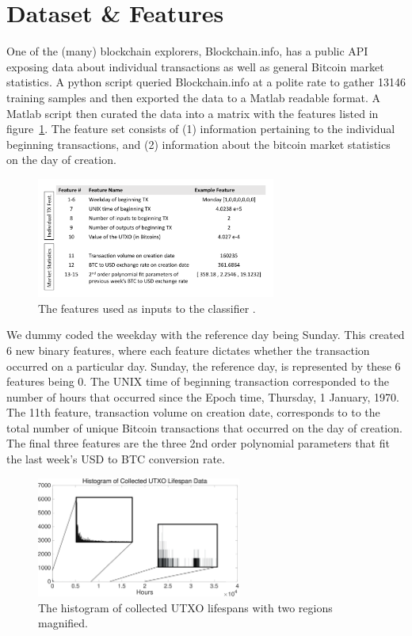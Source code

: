 \documentclass[11pt]{article}
\begin{document}
\section{Dataset \& Features}
One of the (many) blockchain explorers, Blockchain.info, has a public API exposing data about individual transactions as well as general Bitcoin market statistics. A python script queried Blockchain.info at a polite rate to gather 13146 training samples and then exported the data to a Matlab readable format. A Matlab script then curated the data into a matrix with the features listed in figure~\ref{features}. The feature set consists of (1) information pertaining to the individual beginning transactions, and (2) information about the bitcoin market statistics on the day of creation.



\begin{figure}
\begin{center}
\includegraphics[width=0.7\textwidth]{figures/features}
\end{center}
\caption{The features used as inputs to the classifier .}
\label{features}
\end{figure}



We dummy coded the weekday with the reference day being Sunday. This created 6 new binary features, where each feature dictates whether the transaction occurred on a particular day. Sunday, the reference day, is represented by these 6 features being 0. The UNIX time of beginning transaction corresponded to the number of hours that occurred since the Epoch time, Thursday, 1 January, 1970. The 11th feature, transaction volume on creation date, corresponds to to the total number of unique Bitcoin transactions that occurred on the day of creation. The final three features are the three 2nd order polynomial parameters that fit the last week's USD to BTC conversion rate.


\begin{figure}
\begin{center}
\includegraphics[width=0.6\textwidth]{figures/hist.png}
\end{center}
\caption{The histogram of collected UTXO lifespans with two regions magnified.}
\label{hist}
\end{figure}
\end{document}
